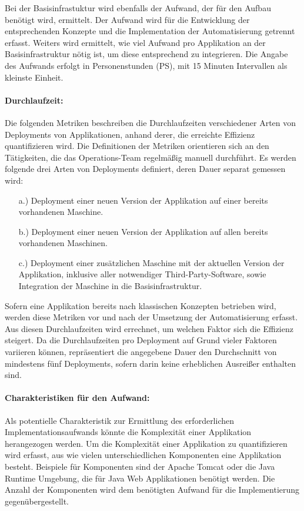 Bei der Basisinfrastuktur wird ebenfalls der Aufwand, der für den Aufbau benötigt wird, ermittelt. Der Aufwand wird für die Entwicklung der entsprechenden Konzepte und die Implementation der Automatisierung getrennt erfasst. Weiters wird ermittelt, wie viel Aufwand pro Applikation an der Basisinfrastruktur nötig ist, um diese entsprechend zu integrieren. Die Angabe des Aufwands erfolgt in Personenstunden (PS), mit 15 Minuten Intervallen als kleinste Einheit.

\paragraph{Durchlaufzeit:} Die folgenden Metriken beschreiben die Durchlaufzeiten verschiedener Arten von Deployments von Applikationen, anhand derer, die erreichte Effizienz quantifizieren wird. Die Definitionen der Metriken orientieren sich an den Tätigkeiten, die das Operations-Team regelmäßig manuell durchführt. Es werden folgende drei Arten von Deployments definiert, deren Dauer separat gemessen wird:
\begin{enumerate}
	\item[a.)] Deployment einer neuen Version der Applikation auf einer bereits vorhandenen Maschine.
	\item[b.)] Deployment einer neuen Version der Applikation auf allen bereits vorhandenen Maschinen.
	\item[c.)] Deployment einer zusätzlichen Maschine mit der aktuellen Version der Applikation, inklusive aller notwendiger Third-Party-Software, sowie Integration der Maschine in die Basisinfrastruktur.
\end{enumerate}
Sofern eine Applikation bereits nach klassischen Konzepten betrieben wird, werden diese Metriken vor und nach der Umsetzung der Automatisierung erfasst. Aus diesen Durchlaufzeiten wird errechnet, um welchen Faktor sich die Effizienz steigert. Da die Durchlaufzeiten pro Deployment auf Grund vieler Faktoren variieren können, repräsentiert die angegebene Dauer den Durchschnitt von mindestens fünf Deployments, sofern darin keine erheblichen Ausreißer enthalten sind.

\paragraph{Charakteristiken für den Aufwand:} Als potentielle Charakteristik zur Ermittlung des erforderlichen Implementationsaufwands könnte die Komplexität einer Applikation herangezogen werden. Um die Komplexität einer Applikation zu quantifizieren wird erfasst, aus wie vielen unterschiedlichen Komponenten eine Applikation besteht. Beispiele für Komponenten sind der Apache Tomcat oder die Java Runtime Umgebung, die für Java Web Applikationen benötigt werden. Die Anzahl der Komponenten wird dem benötigten Aufwand für die Implementierung gegenübergestellt.

